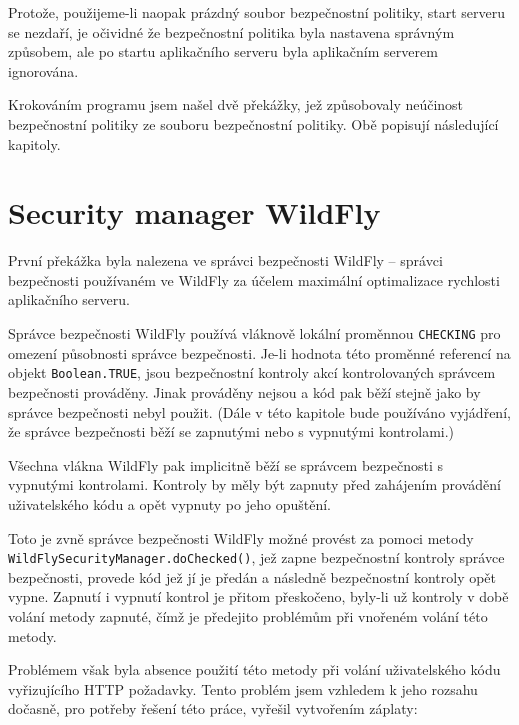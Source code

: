 Protože, použijeme-li naopak prázdný soubor bezpečnostní politiky, start serveru se nezdaří, je očividné že bezpečnostní politika byla nastavena správným způsobem, ale po startu aplikačního serveru byla aplikačním serverem ignorována.

Krokováním programu jsem našel dvě překážky, jež způsobovaly neúčinost bezpečnostní politiky ze souboru bezpečnostní politiky. Obě popisují následující kapitoly.

\section{Security manager WildFly}

První překážka byla nalezena ve správci bezpečnosti WildFly -- správci bezpečnosti používaném ve WildFly za účelem maximální optimalizace rychlosti aplikačního serveru.

Správce bezpečnosti WildFly používá vláknově lokální proměnnou {\tt CHECKING} pro omezení působnosti správce bezpečnosti. Je-li hodnota této proměnné referencí na objekt {\tt Boolean.TRUE}, jsou bezpečnostní kontroly akcí kontrolovaných správcem bezpečnosti prováděny. Jinak prováděny nejsou a kód pak běží stejně jako by správce bezpečnosti nebyl použit. \cite{sourceWildFlySecurityManager} (Dále v této kapitole bude používáno vyjádření, že správce bezpečnosti běží se zapnutými nebo s vypnutými kontrolami.)

Všechna vlákna WildFly pak implicitně běží se správcem bezpečnosti s vypnutými kontrolami. Kontroly by měly být zapnuty před zahájením provádění uživatelského kódu a opět vypnuty po jeho opuštění. \cite{sourceWildFlySecurityManager}

Toto je zvně správce bezpečnosti WildFly možné provést za pomoci metody {\tt WildFlySecurityManager.doChecked()}, jež zapne bezpečnostní kontroly správce bezpečnosti, provede kód jež jí je předán a následně bezpečnostní kontroly opět vypne. Zapnutí i vypnutí kontrol je přitom přeskočeno, byly-li už kontroly v době volání metody zapnuté, čímž je předejito problémům při vnořeném volání této metody. \cite{sourceWildFlySecurityManager}

Problémem však byla absence použití této metody při volání uživatelského kódu vyřizujícího HTTP požadavky. Tento problém jsem vzhledem k jeho rozsahu dočasně, pro potřeby řešení této práce, vyřešil vytvořením záplaty:

